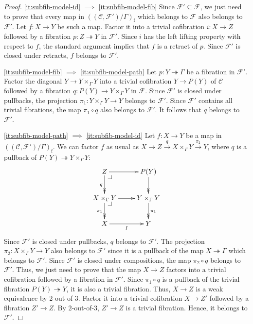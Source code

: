 \documentclass[reqno]{amsart}
\makeatletter
\theoremstyle{definition}
\theoremstyle{remark}
\newcommand{\fs}[1]{\mathrm{#1}}
\newcommand{\scat}[1]{\mathcal{#1}}
\newcommand{\Fib}{\mathcal{F}}
\numberwithin{figure}{section}
\newcommand{\pb}[1][dr]{\save*!/#1-1.2pc/#1:(-1,1)@^{|-}\restore}
\makeatother
\begin{document}
\begin{proof}
\eqref{it:subfib-model-id} $\implies$ \eqref{it:subfib-model-fib}
Since $\Fib' \subseteq \Fib$, we just need to prove that every map in $((\scat{C},\Fib')/\Gamma)_\fs{f}$ which belongs to $\Fib$ also belongs to $\Fib'$.
Let $f : X \to Y$ be such a map.
Factor it into a trivial cofibration $i : X \to Z$ followed by a fibration $p : Z \twoheadrightarrow Y$ in $\Fib'$.
Since $i$ has the left lifting property with respect to $f$, the standard argument implies that $f$ is a retract of $p$.
Since $\Fib'$ is closed under retracts, $f$ belongs to $\Fib'$.

\eqref{it:subfib-model-fib} $\implies$ \eqref{it:subfib-model-path}
Let $p : Y \twoheadrightarrow \Gamma$ be a fibration in $\Fib'$.
Factor the diagonal $Y \to Y \times_\Gamma Y$ into a trivial cofibration $Y \to P(Y)$ of $\scat{C}$ followed by a fibration $q : P(Y) \to Y \times_\Gamma Y$ in $\Fib$.
Since $\Fib'$ is closed under pullbacks, the projection $\pi_1 : Y \times_\Gamma Y \to Y$ belongs to $\Fib'$.
Since $\Fib'$ contains all trivial fibrations, the map $\pi_1 \circ q$ also belongs to $\Fib'$.
It follows that $q$ belongs to $\Fib'$.

\eqref{it:subfib-model-path} $\implies$ \eqref{it:subfib-model-id}
Let $f : X \to Y$ be a map in $((\scat{C},\Fib')/\Gamma)_\fs{f}$.
We can factor $f$ as usual as $X \to Z \xrightarrow{q} X \times_\Gamma Y \xrightarrow{\pi_2} Y$, where $q$ is a pullback of $P(Y) \twoheadrightarrow Y \times_\Gamma Y$:
\[ \xymatrix{ Z \ar[r] \ar@{->>}[d]_q \pb                       & P(Y) \ar@{->>}[d] \\
              X \times_\Gamma Y \ar[r] \ar@{->>}[d]_{\pi_1} \pb & Y \times_\Gamma Y \ar@{->>}[d]^{\pi_1} \\
              X \ar[r]_f                                        & Y
            } \]
Since $\Fib'$ is closed under pullbacks, $q$ belongs to $\Fib'$.
The projection $\pi_2 : X \times_\Gamma Y \to Y$ also belongs to $\Fib'$ since it is a pullback of the map $X \twoheadrightarrow \Gamma$ which belongs to $\Fib'$.
Since $\Fib'$ is closed under compositions, the map $\pi_2 \circ q$ belongs to $\Fib'$.
Thus, we just need to prove that the map $X \to Z$ factors into a trivial cofibration followed by a fibration in $\Fib'$.
Since $\pi_1 \circ q$ is a pullback of the trivial fibration $P(Y) \twoheadrightarrow Y$, it is also a trivial fibration.
Thus, $X \to Z$ is a weak equivalence by 2-out-of-3.
Factor it into a trivial cofibration $X \to Z'$ followed by a fibration $Z' \to Z$.
By 2-out-of-3, $Z' \to Z$ is a trivial fibration.
Hence, it belongs to $\Fib'$.
\end{proof}
\end{document}
